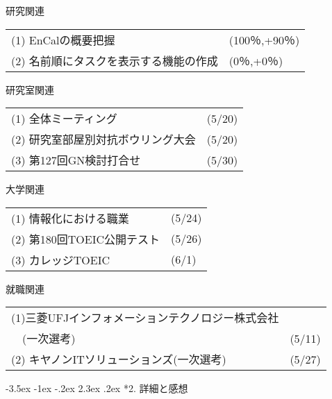 \documentclass[fleqn, 14pt]{extarticlej}
\makeatletter
\def\section{\@startsection {section}{1}{\z@}%
{-3.5ex \@plus -1ex \@minus -.2ex}%
{2.3ex \@plus.2ex}%
{\sectionformat}}
\def\sectionformat{\normalsize}
\makeatother
\begin{document}
\begin{description}
  \itemsep -1mm

  \item[　1.1] 研究関連

    \begin{tabular}{p{11.8cm}l}
      (1) EnCalの概要把握&(100％,+90％)\\
	  (2) 名前順にタスクを表示する機能の作成&(0％,+0％)\\
    \end{tabular}

  \item[　1.2] 研究室関連

    \begin{tabular}{p{11.8cm}l}
      (1) 全体ミーティング&(5/20)\\
      (2) 研究室部屋別対抗ボウリング大会&(5/20)\\
      (3) 第127回GN検討打合せ&(5/30)\\

    \end{tabular}

  \item[　1.3] 大学関連

    \begin{tabular}{p{11.8cm}l}
    (1) 情報化における職業&(5/24)\\
	(2) 第180回TOEIC公開テスト&(5/26)\\
    (3) カレッジTOEIC&(6/1)\\
    
	\end{tabular}
  
  \item[　1.4] 就職関連

    \begin{tabular}{p{11.8cm}l}
	  (1)三菱UFJインフォメーションテクノロジー株式会社\\
	　(一次選考)&(5/11)\\
	  (2) キヤノンITソリューションズ(一次選考)&(5/27)\\
    \end{tabular}
    

\end{description}

\vspace{-1.5em}
\section*{2. 詳細と感想}
\vspace{-1.0em}
\end{document}
